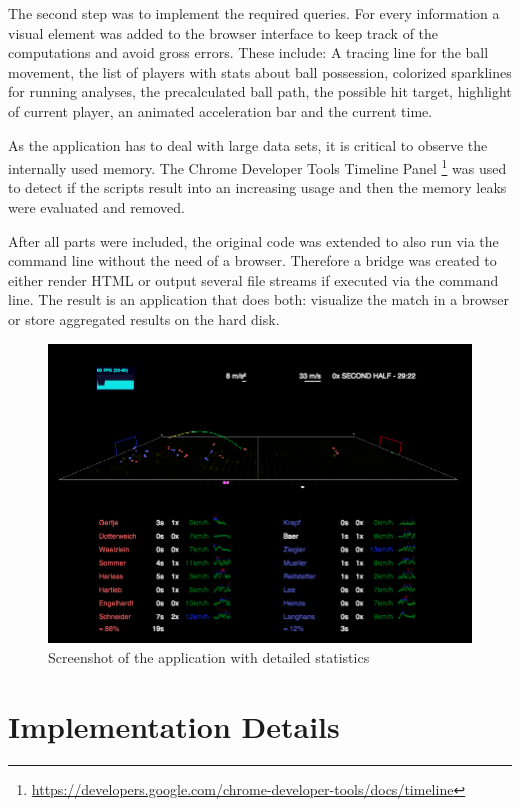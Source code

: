 \documentclass{sig-alternate}
\newcommand{\inlinelistingsize}{\fontsize{8pt}{11pt}}
\let\oldurl\url
\renewcommand{\url}[1]{\inlinelistingsize\oldurl{#1}}
\begin{document}
The second step was to implement the required queries.
For every information a visual element was added
to the browser interface to keep track of the computations
and avoid gross errors.
These include: A tracing line for the ball movement,  
the list of players with stats about ball possession,
colorized sparklines for running analyses,
the precalculated ball path, the possible hit target,
highlight of current player, an animated acceleration bar
and the current time.

As the application has to deal with large data sets,
it is critical to observe the internally used memory.
The Chrome Developer Tools Timeline Panel%
\footnote{\url{https://developers.google.com/chrome-developer-tools/docs/timeline}}
was used
to detect if the scripts result into an increasing usage
and then the memory leaks were evaluated and removed.

After all parts were included, the original code
was extended to also run via the command line
without the need of a browser.
Therefore a bridge was created to either render HTML
or output several file streams if executed via the command line.
The result is an application that does both:
visualize the match in a browser or store aggregated results
on the hard disk.

\begin{figure}[t!]
  \centering
  \includegraphics[width=\linewidth]{soccer.png}
  \caption{Screenshot of the application with detailed statistics}
  \label{fig:screenshot}
\end{figure}

\section{Implementation Details}
\label{sec:implementation-details}
\end{document}
